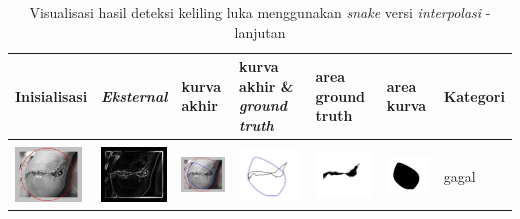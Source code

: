 \begin{table}[H]
	\centering
	\caption{Visualisasi hasil deteksi keliling luka menggunakan \emph{snake} versi \emph{interpolasi} - lanjutan}
	\label{tabel_hasil_4_interp}
	\begin{tabular}{|m{0.7in}|m{0.7in}|m{0.7in}|m{0.7in}|m{0.7in}|m{0.7in}|m{0.7in}|}
		\hline
		\textbf{Inisialisasi} & \textbf{\emph{Eksternal}} & \textbf{kurva akhir} & \textbf{kurva akhir \& \emph{ground truth}}& \textbf{area ground truth} & \textbf{area kurva} & \textbf{Kategori} \\
		\hline
		
		&  &  & & & &  \\
		\includegraphics[width=0.7in]{dataset/dataset_3/luka_hitam/ready/16_interp_init.jpg}&
		\includegraphics[width=0.7in]{dataset/dataset_3/luka_hitam/ready/16_interp_ext.jpg}&
		\includegraphics[width=0.7in]{dataset/dataset_3/luka_hitam/ready/16_interp_result.jpg}&
		\includegraphics[width=0.7in]{dataset/dataset_3/luka_hitam/ready/16_gt_r.jpg}&
		\includegraphics[width=0.7in]{dataset/dataset_3/luka_hitam/ready/16_r.jpg}&
		\includegraphics[width=0.7in]{dataset/dataset_3/luka_hitam/ready/16_interp_r.jpg}&
		gagal\\
		\hline
		

\end{tabular}
\end{table}
